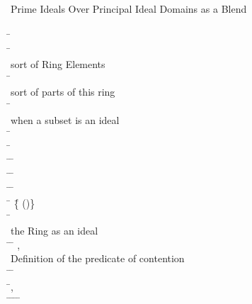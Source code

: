 \begin{hetcasl}
 \\
\\
 \\
{\small{}\KW{\%\%} Prime Ideals Over Principal Ideal Domains as a Blend}\\
\\
\SPEC \= \Ax{=}\\
\> \SORT \=\\
\>\> {\small{}\KW{\%\%} sort of Ring Elements}\\
\> \SORT \=\\
\>\> {\small{}\KW{\%\%} sort of parts of this ring}\\
\> \PRED \= \Ax{:} \\
\>\> {\small{}\KW{\%\%} when a subset is an ideal}\\
\> \OP \= \Ax{:} \\
\> \OP \= \Ax{:} \\
\> \OP \=\Ax{\_\_}\Ax{*}\Ax{\_\_} \Ax{:} \= \Ax{\times}  \Ax{\rightarrow} \\
\> \OP \=\Ax{\_\_}\Ax{+}\Ax{\_\_} \Ax{:} \= \Ax{\times}  \Ax{\rightarrow} \\
\> \PRED \=\Ax{\_\_}\Ax{\_\_} \Ax{:} \= \Ax{\times} \\
\> \SORT \= \Ax{=} \=\{ \Ax{:}  \Ax{\bullet} ()\}\\
\> \OP \= \Ax{:} \\
\>\> {\small{}\KW{\%\%} the Ring as an ideal}\\
\> \OP \=\Ax{\_\_}\Ax{**}\Ax{\_\_} \Ax{:} \= \Ax{\times}  \Ax{\rightarrow} ,  \\
\>\> {\small{}\KW{\%\%}Definition of the predicate of contention}\\
\> \PRED \=\Ax{\_\_}\Ax{\_\_} \Ax{:} \= \Ax{\times} \\
\> \Ax{\forall} \=,  \Ax{:}  \\
\> \Ax{\bullet} \=   \Ax{\Leftrightarrow} \=\Ax{\forall}  \Ax{:}  \Ax{\bullet} \=   \Ax{\Rightarrow} \=  \\

\end{hetcasl}
